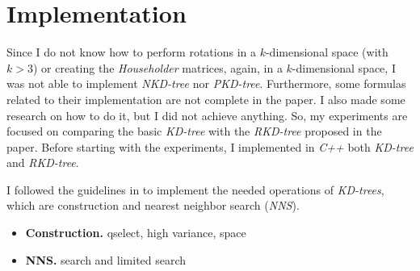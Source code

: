 \section{Implementation}
Since I do not know how to perform rotations in a $k$-dimensional space (with $k > 3$) or creating the \textit{Householder} matrices, again, in a $k$-dimensional space, I was not able to implement \textit{NKD-tree} nor \textit{PKD-tree}. Furthermore, some formulas related to their implementation are not complete in the paper. I also made some research on how to do it, but I did not achieve anything. So, my experiments are focused on comparing the basic \textit{KD-tree} with the \textit{RKD-tree} proposed in the paper. Before starting with the experiments, I implemented in \textit{C++} both \textit{KD-tree} and \textit{RKD-tree}.

I followed the guidelines in \cite{wiki} to implement the needed operations of \textit{KD-trees}, which are construction and nearest neighbor search (\textit{NNS}).
\begin{itemize}
    \item \textbf{Construction.} qselect, high variance, space
    \item \textbf{NNS.} \cite{nns} search and limited search
\end{itemize}